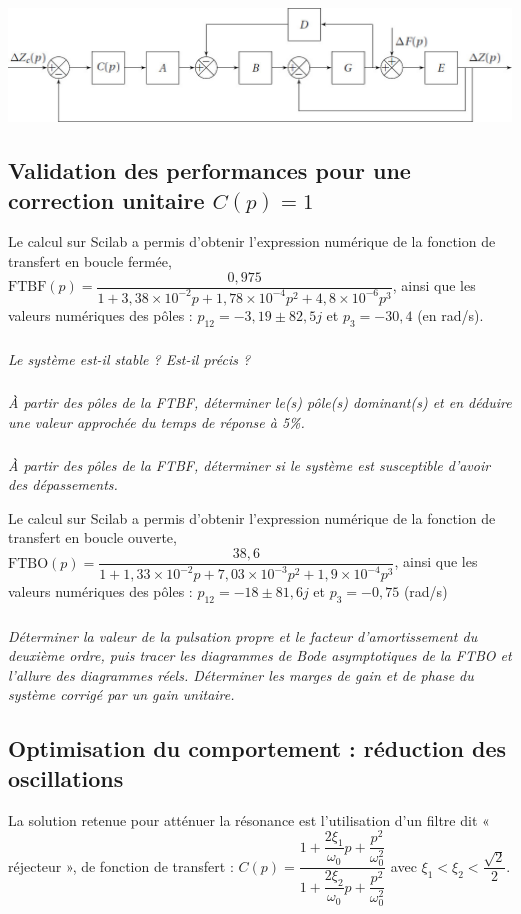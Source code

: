 \documentclass[10pt,fleqn]{article} %
\begin{document}
\begin{multicols}{2}
\begin{center}
\includegraphics[width=\linewidth]{images/fig_04}
\end{center}

\subsection*{Validation des performances pour une correction unitaire $C(p) = 1$}

Le calcul sur Scilab a permis d’obtenir l’expression numérique de la fonction de transfert en
boucle fermée, $\text{FTBF}(p) = \dfrac{0,975}{1+3,38\times 10^{-2}p+1,78\times 10^{-4}p^2+4,8\times 10^{-6}p^3}$, ainsi que les valeurs numériques des pôles : $p_{12}=-3,19 \pm 82,5 j$ et $p_3 = -30,4$ (en rad/s).

\subparagraph{}\textit{Le système est-il stable ? Est-il précis ?}

\subparagraph{}\textit{À partir des pôles de la FTBF, déterminer le(s) pôle(s) dominant(s) et en déduire une valeur
approchée du temps de réponse à 5\%.}

\subparagraph{}\textit{À partir des pôles de la FTBF, déterminer si le système est susceptible d’avoir des dépassements.}

Le calcul sur Scilab a permis d’obtenir l’expression numérique de la fonction de transfert en boucle
ouverte, $\text{FTBO}(p) = \dfrac{38,6}{1+1,33\times 10^{-2}p+7,03\times 10^{-3}p^2+1,9\times 10^{-4}p^3}$, ainsi que les valeurs numériques des pôles : $p_{12}=-18 \pm 81,6 j$ et $p_3 = -0,75$ (rad/s)

\subparagraph{}\textit{Déterminer la valeur de la pulsation propre et le facteur d’amortissement du deuxième ordre,
puis tracer les diagrammes de Bode asymptotiques de la FTBO et l’allure des diagrammes
réels. Déterminer les marges de gain et de phase du système corrigé par un gain unitaire.}


\subsection*{Optimisation du comportement : réduction des oscillations}
La solution retenue pour atténuer la résonance est l’utilisation d’un filtre dit « réjecteur », de
fonction de transfert :
$C(p)=\dfrac{1+\dfrac{2\xi_1}{\omega_0}p+\dfrac{p^2}{\omega_0^2}}{1+\dfrac{2\xi_2}{\omega_0}p+\dfrac{p^2}{\omega_0^2}}$ avec $\xi_1 < \xi_2 < \dfrac{\sqrt{2}}{2}$.


\end{multicols}
\end{document}
